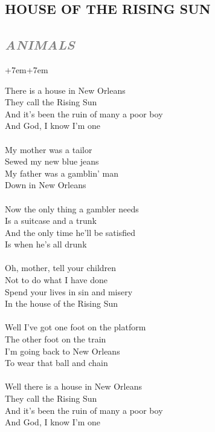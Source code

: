 \documentclass[100pt,a4paper]{report}
\newenvironment{song1}[3]
	{
			\begin{spacing}{0.6}
				\section*{\LARGE\centering \MakeUppercase{\textbf{{#1}}}}
				\subsection*{\Large\centering \textit{\textcolor{gray}{\MakeUppercase{{#2}}}}}
			\end{spacing}
			\vspace{0.8cm}
			\begin{adjustwidth}{+7em}{+7em}
			\Large
			
	}
	{
		\end{adjustwidth}
		\newpage
    }
\begin{document}
\begin{song1}{House Of The Rising Sun}{Animals}
\noindent
There is a house in New Orleans\\
They call the Rising Sun\\
And it's been the ruin of many a poor boy\\
And God, I know I'm one\\
\\
My mother was a tailor\\
Sewed my new blue jeans\\
My father was a gamblin' man\\
Down in New Orleans\\
\\
Now the only thing a gambler needs\\
Is a suitcase and a trunk\\
And the only time he'll be satisfied\\
Is when he's all drunk\\
\\
Oh, mother, tell your children\\
Not to do what I have done\\
Spend your lives in sin and misery\\
In the house of the Rising Sun\\
\\
Well I've got one foot on the platform\\
The other foot on the train\\
I'm going back to New Orleans\\
To wear that ball and chain\\
\\
Well there is a house in New Orleans\\
They call the Rising Sun\\
And it's been the ruin of many a poor boy\\
And God, I know I'm one\\
\end{song1}
\end{document}
